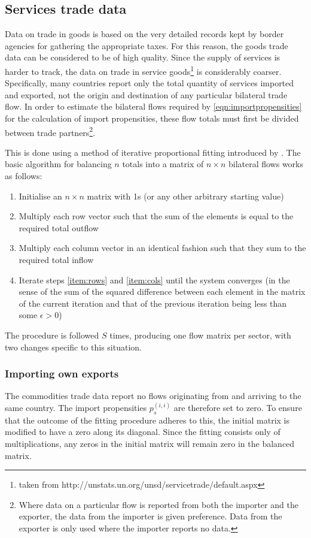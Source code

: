 \documentclass[a4paper]{article}
\begin{document}
\subsection{Services trade data}
Data on trade in goods is based on the very detailed records kept by border agencies for gathering the appropriate taxes.
For this reason, the goods trade data can be considered to be of high quality.
Since the supply of services is harder to track, the data on trade in service goods\footnote{taken from http://unstats.un.org/unsd/servicetrade/default.aspx} is considerably coarser.
Specifically, many countries report only the total quantity of services imported and exported, not the origin and destination of any particular bilateral trade flow.
In order to estimate the bilateral flows required by \cref{eqn:importpropensities} for the calculation of import propensities, these flow totals must first be divided between trade partners\footnote{Where data on a particular flow is reported from both the importer and the exporter, the data from the importer is given preference.
Data from the exporter is only used where the importer reports no data.}.

This is done using a method of iterative proportional fitting introduced by \textcite{deming_least_1940}.
The basic algorithm for balancing $n$ totals into a matrix of $n \times n$ bilateral flows works as follows:
\begin{enumerate}
\itemsep -0.2em 
\item Initialise an $n \times n$ matrix with 1s (or any other arbitrary starting value)
\item Multiply each row vector such that the sum of the elements is equal to the required total outflow \label{item:rows}
\item Multiply each column vector in an identical fashion such that they sum to the required total inflow \label{item:cols}
\item Iterate steps \ref{item:rows} and \ref{item:cols} until the system converges (in the sense of the sum of the squared difference between each element in the matrix of the current iteration and that of the previous iteration being less than some $\epsilon > 0$)
\end{enumerate}
The procedure is followed $S$ times, producing one flow matrix per sector, with two changes specific to this situation.
\subsubsection*{Importing own exports}
The commodities trade data report no flows originating from and arriving to the same country.
The import propensities $p_s^{(i,i)}$ are therefore set to zero.
To ensure that the outcome of the fitting procedure adheres to this, the initial matrix is modified to have a zero along its diagonal.
Since the fitting consists only of multiplications, any zeros in the initial matrix will remain zero in the balanced matrix.
\end{document}
